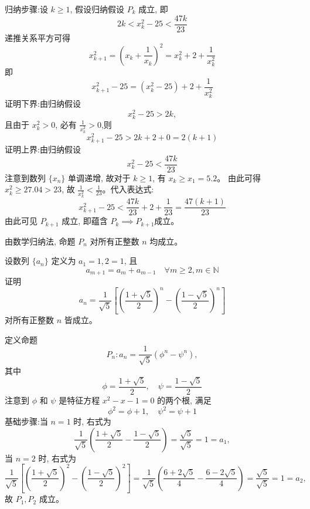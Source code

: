 \begin{questions}
\begin{solution}
        归纳步骤:设 $k \ge 1$, 假设归纳假设 $P_k$ 成立, 即 
        \[
        2k < x_k^2 - 25 < \frac{47k}{23}
        \]
        递推关系平方可得
        \[
        x_{k+1}^2 = \left( x_k + \frac{1}{x_k} \right)^2 = x_k^2 + 2 + \frac{1}{x_k^2}
        \]
        即
        \[
        x_{k+1}^2 - 25 = (x_k^2 - 25) + 2 + \frac{1}{x_k^2}
        \]
        证明下界:由归纳假设 
        \[
        x_k^2 - 25 > 2k,
        \]
        且由于 $x_k^2 > 0$, 必有 $\frac{1}{x_k^2} > 0$,则
        \[
        x_{k+1}^2 - 25 > 2k + 2 + 0 = 2(k+1)
        \]
        证明上界:由归纳假设 
        \[
        x_k^2 - 25 < \frac{47k}{23}
        \]
        注意到数列 $\{x_n\}$ 单调递增, 故对于 $k \ge 1$, 有 $x_k \ge x_1 = 5.2$。
        由此可得 $x_k^2 \ge 27.04 > 23$, 故 $\frac{1}{x_k^2} < \frac{1}{23}$。代入表达式:
        \[
        x_{k+1}^2 - 25 < \frac{47k}{23} + 2 + \frac{1}{23} = \frac{47(k+1)}{23}
        \]
        由此可见 $P_{k+1}$ 成立, 即蕴含 $P_k \implies P_{k+1}$成立。

        由数学归纳法, 命题 $P_n$ 对所有正整数 $n$ 均成立。
    \end{solution}

    \question 设数列 $\{a_n\}$ 定义为 $a_1 = 1,2 = 1$, 且 
    \[
    a_{m+1} = a_m + a_{m-1} \quad \forall m \ge 2, m \in \mathbb{N}
    \]
    证明
    \[
    a_n = \frac{1}{\sqrt{5}}\left[\left(\frac{1+\sqrt{5}}{2}\right)^n - \left(\frac{1-\sqrt{5}}{2}\right)^n\right]
    \]
    对所有正整数 $n$ 皆成立。
    \begin{solution}
        定义命题 
        \[
        P_n:a_n = \frac{1}{\sqrt{5}}\left(\phi^n - \psi^n\right), 
        \]
        其中 
        \[
        \phi = \frac{1+\sqrt{5}}{2},\quad \psi = \frac{1-\sqrt{5}}{2}
        \]
        注意到 $\phi$ 和 $\psi$ 是特征方程 $x^2 - x - 1 = 0$ 的两个根, 满足 
        \[
        \phi^2 = \phi + 1, \quad\psi^2 = \psi + 1
        \]
        基础步骤:当 $n=1$ 时, 右式为 
        \[
        \frac{1}{\sqrt{5}}\left(\frac{1+\sqrt{5}}{2} - \frac{1-\sqrt{5}}{2}\right) = \frac{\sqrt{5}}{\sqrt{5}} = 1 = a_1, 
        \]
        当 $n=2$ 时, 右式为 
        \[
        \frac{1}{\sqrt{5}}\left[\left(\frac{1+\sqrt{5}}{2}\right)^2 - \left(\frac{1-\sqrt{5}}{2}\right)^2\right] = \frac{1}{\sqrt{5}}\left(\frac{6+2\sqrt{5}}{4} - \frac{6-2\sqrt{5}}{4}\right) = \frac{\sqrt{5}}{\sqrt{5}} = 1 = a_2,
        \]
        故 $P_1,P_2$ 成立。


\end{solution}
\end{questions}
